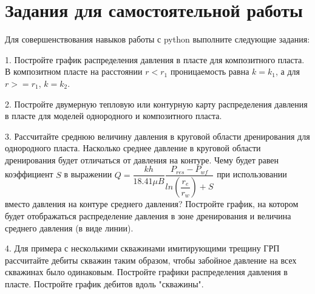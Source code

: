 \section{Задания для самостоятельной работы}

Для совершенствования навыков работы с python выполните следующие задания:

1. Постройте график распределения давления в пласте для композитного пласта. В композитном пласте на расстоянии $r<r_1$ проницаемость равна $k=k_1$, а для $r>=r_1$, $k=k_2$. 

2. Постройте двумерную тепловую или контурную карту распределения давления в пласте для моделей однородного и композитного пласта.

3. Рассчитайте среднюю величину давления в круговой области дренирования для однородного пласта. Насколько среднее давление в круговой области дренирования будет отличаться от давления на контуре. Чему будет равен коэффициент $S$ в выражении  $Q=\dfrac{kh}{18.41\mu B} \dfrac{P_{res}-P_{wf}}{ln(\dfrac{r_e}{r_w})+S}$ при использовании вместо давления на контуре среднего давления? Постройте график, на котором будет отображаться распределение давления в зоне дренирования и величина среднего давления (в виде линии).

4. Для примера с несколькими скважинами имитирующими трещину ГРП рассчитайте дебиты скважин таким образом, чтобы забойное давление на всех скважинах было одинаковым. Постройте графики распределения давления в пласте. Постройте график дебитов вдоль "скважины".

